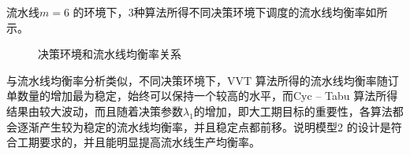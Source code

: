 流水线$m = 6$ 的环境下，$3$种算法所得不同决策环境下调度的流水线均衡率如所示。
\begin{figure}
\centering
{}
\caption{决策环境和流水线均衡率关系}\label{fig:decisionvsrate}
\end{figure}

与流水线均衡率分析类似，不同决策环境下，VVT 算法所得的流水线均衡率随订单数量的增加最为稳定，始终可以保持一个较高的水平，而Cyc -- Tabu 算法所得结果由较大波动，而且随着决策参数$\lambda_1$的增加，即大工期目标的重要性，各算法都会逐渐产生较为稳定的流水线均衡率，并且稳定点都前移。说明模型2 的设计是符合工期要求的，并且能明显提高流水线生产均衡率。

